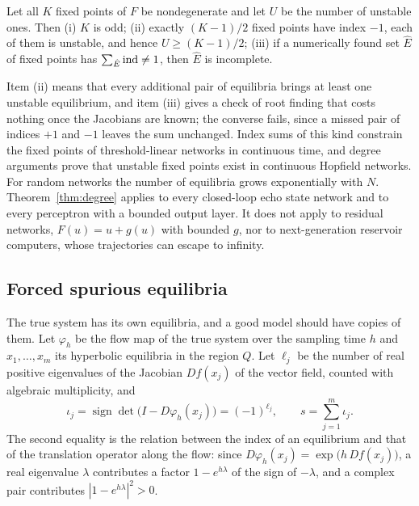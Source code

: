 \begin{corollary}
\label{cor:counts}
Let all $K$ fixed points of $F$ be nondegenerate and let $U$ be the number of unstable ones. Then
(i) $K$ is odd;
(ii) exactly $(K-1)/2$ fixed points have index $-1$, each of them is unstable, and hence $U\ge(K-1)/2$;
(iii) if a numerically found set $\hat E$ of fixed points has $\sum_{\hat E}\operatorname{ind}\neq1$, then $\hat E$ is incomplete.
\end{corollary}

Item (ii) means that every additional pair of equilibria brings at least one unstable equilibrium, and item (iii) gives a
check of root finding that costs nothing once the Jacobians are known; the converse fails, since a missed pair of indices
$+1$ and $-1$ leaves the sum unchanged. Index sums of this kind constrain the fixed points of threshold-linear networks in
continuous time,\cite{Curto2019TLN,Morrison2024TLN} and degree arguments prove that unstable fixed points exist in
continuous Hopfield networks.\cite{Beise2026UnstableHopfield} For random networks the number of equilibria grows
exponentially with $N$.\cite{WainribTouboul2013,BenArous2021Counting} Theorem~\ref{thm:degree} applies to every closed-loop
echo state network and to every perceptron with a bounded output layer. It does not apply to residual networks,
$F(u)=u+g(u)$ with bounded $g$, nor to next-generation reservoir computers, whose trajectories can escape to infinity.

\subsection{Forced spurious equilibria}
\label{sec:forced}

The true system has its own equilibria, and a good model should have copies of them. Let $\varphi_h$ be the flow map of
the true system over the sampling time $h$ and $x_1,\dots,x_m$ its hyperbolic equilibria in the region $Q$. Let $\ell_j$ be
the number of real positive eigenvalues of the Jacobian $Df(x_j)$ of the vector field, counted with algebraic multiplicity,
and
\begin{equation}
\iota_j=\operatorname{sign}\det\bigl(I-D\varphi_h(x_j)\bigr)=(-1)^{\ell_j},\qquad s=\sum_{j=1}^m\iota_j.
\label{eq:trueindex}
\end{equation}
The second equality is the relation between the index of an equilibrium and that of the translation operator along the
flow:\cite{KrasnoselskiiTranslation1968} since $D\varphi_h(x_j)=\exp\bigl(h\,Df(x_j)\bigr)$, a real eigenvalue $\lambda$
contributes a factor $1-e^{h\lambda}$ of the sign of $-\lambda$, and a complex pair contributes $|1-e^{h\lambda}|^2>0$.

